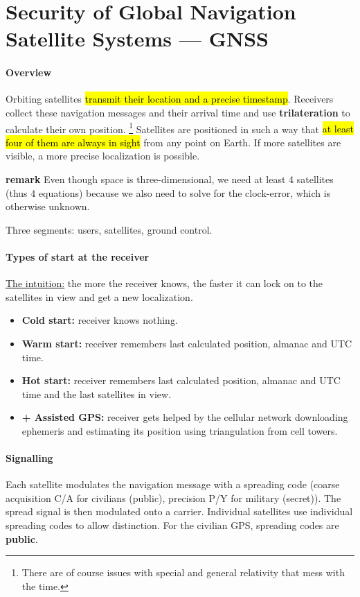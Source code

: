 \section{Security of Global Navigation Satellite Systems --- GNSS}

\paragraph{Overview}
Orbiting satellites \hl{transmit their location and a precise timestamp}.
Receivers collect these navigation messages and their arrival time and use
\textbf{trilateration} to calculate their own position. \footnote{There are of
	course issues with special and general relativity that mess with the time.}
Satellites are positioned in such a way that \hl{at least four of them are
	always in sight} from any point on Earth. If more satellites are visible, a
more precise localization is possible.

\textbf{remark}	Even though space is three-dimensional, we need at least 4 satellites (thus 4 equations) because we also need to solve for the clock-error, which is otherwise unknown.

Three segments: users, satellites, ground control.

\paragraph{Types of start at the receiver}
\underline{The intuition:} the more the receiver knows, the faster it can lock on to the satellites in view and get a new localization.
\begin{itemize}
	\item \textbf{Cold start:} receiver knows nothing.
	\item \textbf{Warm start:} receiver remembers last calculated position, almanac and UTC time.
	\item \textbf{Hot start:} receiver remembers last calculated position, almanac and UTC time and the last satellites in view.
	\item \textbf{+ Assisted GPS:} receiver gets helped by the cellular network downloading ephemeris and estimating its position using triangulation from cell towers.
\end{itemize}

\paragraph{Signalling}
Each satellite modulates the navigation message with a spreading code (coarse
acquisition C/A for civilians (public), precision P/Y for military (secret)).
The spread signal is then modulated onto a carrier. Individual satellites use
individual spreading codes to allow distinction. For the civilian GPS,
spreading codes are \textbf{public}.

